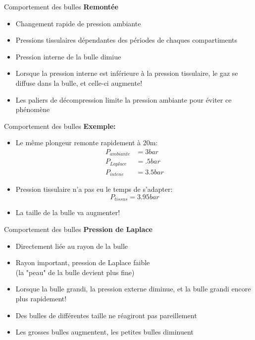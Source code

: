 \begin{frame}{Comportement des bulles}  
	\textbf{Remontée}
	\begin{itemize}
		\item Changement rapide de pression ambiante
		\item Pressions tissulaires dépendantes des périodes de chaques compartiments
		\pause \vfill
		\item Pression interne de la bulle dimiue
		\pause \vfill
		\item Lorsque la pression interne est inférieure à la pression tissulaire, le gaz se diffuse dans la bulle, et celle-ci augmente!
		\pause \vfill
		\item Les paliers de décompression limite la pression ambiante pour éviter ce phénomène
	\end{itemize}
\end{frame}

\begin{frame}{Comportement des bulles}  
	\textbf{Exemple:}
	\begin{itemize}
		\item Le même plongeur remonte rapidement à 20m:
				\begin{align*}
					P_{ambiante} &= 3 bar\\
					P_{Laplace} &= .5 bar\\
					P_{intene} &= 3.5 bar
				\end{align*} \pause
		\item Pression tissulaire n'a pas eu le temps de s'adapter:
				$$P_{tissus} =3.95 bar $$ \pause

		\item La taille de la bulle va augmenter!
	\end{itemize}
\end{frame}

\begin{frame}{Comportement des bulles}
	\textbf{Pression de Laplace}
	\begin{itemize}
		\item Directement liée au rayon de la bulle
		\item Rayon important, pression de Laplace faible\\(la "peau" de la bulle devient plus fine)
		\item Lorsque la bulle grandi, la pression externe diminue, et la bulle grandi encore plus rapidement!
		\item Des bulles de différentes taille ne réagiront pas pareillement
		\vfill
		\item Les grosses bulles augmentent, les petites bulles diminuent
	\end{itemize}
\end{frame}

